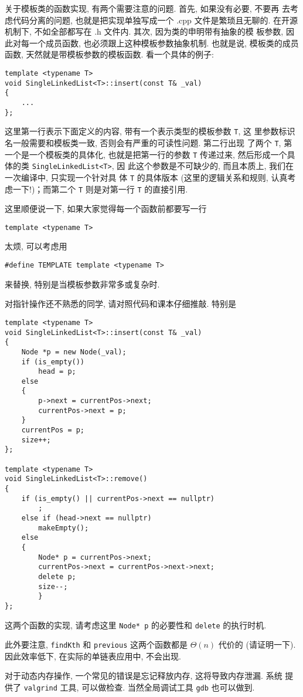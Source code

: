 \documentclass[a4paper]{ctexart}
\theoremstyle{definition}
\theoremstyle{definition}
\begin{document}
关于模板类的函数实现, 有两个需要注意的问题. 首先, 如果没有必要, 不要再
去考虑代码分离的问题, 也就是把实现单独写成一个 .cpp 文件是繁琐且无聊的.
在开源机制下, 不如全部都写在 .h 文件内. 其次, 因为类的申明带有抽象的模
板参数, 因此对每一个成员函数, 也必须跟上这种模板参数抽象机制. 也就是说,
模板类的成员函数, 天然就是带模板参数的模板函数. 看一个具体的例子:
\begin{verbatim}
template <typename T>
void SingleLinkedList<T>::insert(const T& _val)
{
    ...
};
\end{verbatim}
这里第一行表示下面定义的内容, 带有一个表示类型的模板参数 \verb|T|, 这
里参数标识名一般需要和模板类一致, 否则会有严重的可读性问题. 第二行出现
了两个 \verb|T|, 第一个是一个模板类的具体化, 也就是把第一行的参数
\verb|T| 传递过来, 然后形成一个具体的类 \verb|SingleLinkedList<T>|, 因
此这个参数是不可缺少的, 而且本质上, 我们在一次编译中, 只实现一个针对具
体 \verb|T| 的具体版本 (这里的逻辑关系和规则, 认真考虑一下!)；而第二个
\verb|T| 则是对第一行 \verb|T| 的直接引用.

这里顺便说一下, 如果大家觉得每一个函数前都要写一行
\begin{verbatim}
template <typename T>
\end{verbatim}
太烦, 可以考虑用
\begin{verbatim}
#define TEMPLATE template <typename T>
\end{verbatim}
来替换, 特别是当模板参数非常多或复杂时.

对指针操作还不熟悉的同学, 请对照代码和课本仔细推敲. 特别是
\begin{verbatim}
template <typename T>
void SingleLinkedList<T>::insert(const T& _val)
{
	Node *p = new Node(_val);
	if (is_empty())
		head = p;
	else
	{
		p->next = currentPos->next;
		currentPos->next = p;
	}
	currentPos = p;
	size++;
};

template <typename T>
void SingleLinkedList<T>::remove()
{
	if (is_empty() || currentPos->next == nullptr)
		;
	else if (head->next == nullptr)
		makeEmpty();
	else 
	{
		Node* p = currentPos->next;
		currentPos->next = currentPos->next->next;
		delete p;
		size--;
        }
};
\end{verbatim}
这两个函数的实现, 请考虑这里 \verb|Node* p| 的必要性和 \verb|delete|
的执行时机.

此外要注意, \verb|findKth| 和 \verb|previous| 这两个函数都是
$\Theta(n)$ 代价的 (请证明一下). 因此效率低下, 在实际的单链表应用中,
不会出现.

对于动态内存操作, 一个常见的错误是忘记释放内存, 这将导致内存泄漏. 系统
提供了 \verb|valgrind| 工具, 可以做检查. 当然全局调试工具 \verb|gdb|
也可以做到. 
\end{document}
